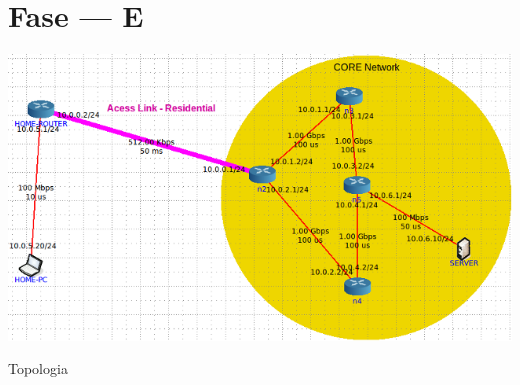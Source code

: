 \section{Fase --- E}

\begin{center}
 	
 	\includegraphics[width=\textwidth,height=\textheight,keepaspectratio]{resources/images/Alinea1/topologia.png}
 	\captionsetup{type=figure, width=0.8\linewidth}
	\caption{Topologia}
\label{fig:ssec1:topologia} 
\end{center}






